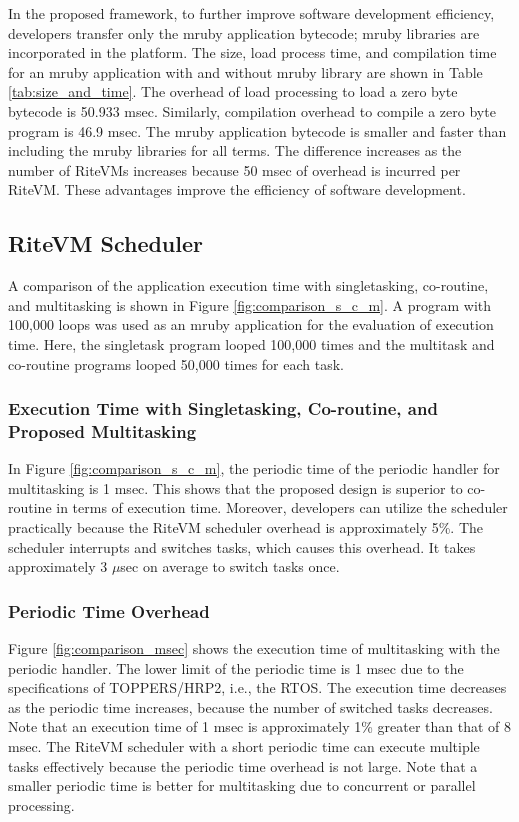 \documentclass{sig-alternate-05-2015}
\begin{document}
In the proposed framework, to further improve software development efficiency, developers transfer only the mruby application bytecode; mruby libraries are incorporated in the platform.
The size, load process time, and compilation time for an mruby application with and without mruby library are shown in Table \ref{tab:size_and_time}.
The overhead of load processing to load a zero byte bytecode is 50.933 msec.
Similarly, compilation overhead to compile a zero byte program is 46.9 msec.
The mruby application bytecode is smaller and faster than including the mruby libraries for all terms.
The difference increases as the number of RiteVMs increases because 50 msec of overhead is incurred per RiteVM. 
These advantages improve the efficiency of software development.


\subsection{RiteVM Scheduler}
A comparison of the application execution time with singletasking, co-routine, and multitasking is shown in Figure \ref{fig:comparison_s_c_m}.
A program with 100,000 loops was used as an mruby application for the evaluation of execution time.
Here, the singletask program looped 100,000 times and the multitask and co-routine programs looped 50,000 times for each task.


\subsubsection{Execution Time with Singletasking, Co-routine, and Proposed Multitasking}
In Figure \ref{fig:comparison_s_c_m}, the periodic time of the periodic handler for multitasking is 1 msec.
This shows that the proposed design is superior to co-routine in terms of execution time.
Moreover, developers can utilize the scheduler practically because the RiteVM scheduler overhead is approximately 5\%.
The scheduler interrupts and switches tasks, which causes this overhead.
It takes approximately 3 $\mu$sec on average to switch tasks once.

\subsubsection{Periodic Time Overhead}
Figure \ref{fig:comparison_msec} shows the execution time of multitasking with the periodic handler.
The lower limit of the periodic time is 1 msec due to the specifications of TOPPERS/HRP2, i.e., the RTOS.
The execution time decreases as the periodic time increases, because the number of switched tasks decreases.
Note that an execution time of 1 msec is approximately 1\% greater than that of 8 msec.
The RiteVM scheduler with a short periodic time can execute multiple tasks effectively because the periodic time overhead is not large.
Note that a smaller periodic time is better for multitasking due to concurrent or parallel processing.
\end{document}
